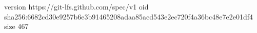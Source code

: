 version https://git-lfs.github.com/spec/v1
oid sha256:6682cd30e9257b6e3b91465208adaa85acd543e2ec720f4a36bc48e7e2e01df4
size 467
